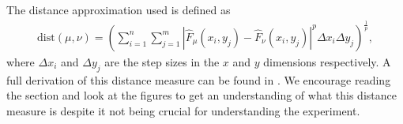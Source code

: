 The distance approximation used is defined as 
\begin{align*}
    \mathrm{dist}(\mu,\nu) = \left( \sum_{i=1}^n \sum_{j=1}^m |\hat F_\mu(x_i,y_j) - \hat F_\nu(x_i,y_j)|^p \Delta x_i \Delta y_j \right)^{\frac{1}{p}},
\end{align*}
where $\Delta x_i$ and $\Delta y_j$ are the step sizes in the $x$ and $y$ dimensions respectively. A full derivation of this distance measure can be found in . We encourage reading the section and look at the figures to get an understanding of what this distance measure is despite it not being crucial for understanding the experiment.  










